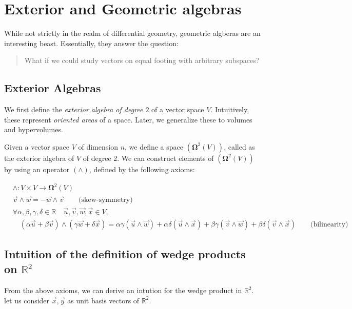 \documentclass[11pt]{book}
\newcommand{\R}{\ensuremath{\mathbb R}}
\begin{document}
\chapter{Exterior and Geometric algebras}

While not strictly in the realm of differential geometry, geometric algberas
are an interesting beast. Essentially, they answer the question:

\begin{quote}
    What if we could study vectors on equal footing with arbitrary subspaces?
\end{quote}

\section{Exterior Algebras}
We first define the \emph{exterior algebra of degree $2$} of a vector space $V$.
Intuitively, these represent \emph{oriented areas} of a space. Later,
we generalize these to volumes and hypervolumes.

Given a vector space $V$ of dimension $n$, we define a space $(\mathbf \Omega^2(V))$, called
as the exterior algebra of $V$ of degree 2. We can construct 
elements of $(\mathbf \Omega^2(V))$
by using an operator $(\wedge)$, defined by the following axioms:

\begin{align*}
    &\wedge: V \times V \rightarrow \mathbf \Omega^2(V) \\
    &\vec v \wedge \vec w  = -\vec w \wedge \vec v \qquad \text{(skew-symmetry)}\\
    &\forall \alpha, \beta, \gamma, \delta \in \R \quad \vec u, \vec v,\vec w, \vec x \in V, \\
    &\quad (\alpha \vec u + \beta \vec v) \wedge (\gamma \vec w + \delta \vec x) = 
        \alpha \gamma (\vec u \wedge \vec w) + 
        \alpha \delta (\vec u \wedge \vec x) + 
        \beta \gamma  (\vec v \wedge \vec w) + 
        \beta \delta  (\vec v \wedge \vec x) \qquad \text{(bilinearity)}
\end{align*}

\section{Intuition of the definition of wedge products on $\R^2$}

From the above axioms, we can derive an intution for the wedge product in
$\mathbb R^2$. let us consider $\vec x, \vec y$ as unit basis vectors of $\R^2$.
\end{document}
